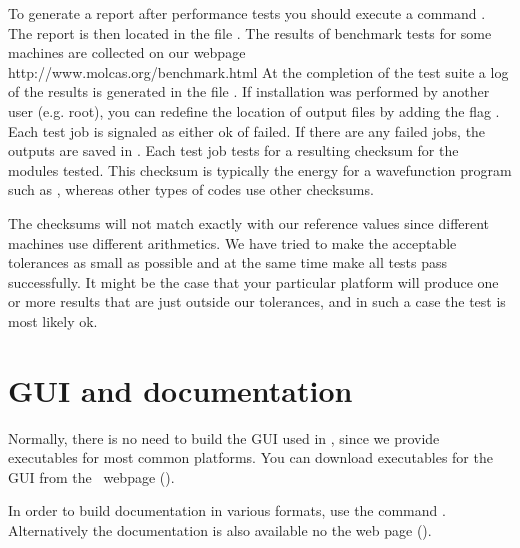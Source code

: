 To generate a report after performance tests you should execute
  a command . The report is then located in the file
  . The results of benchmark tests
  for some machines are collected on our webpage \\
  http://www.molcas.org/benchmark.html
At the completion of the test suite a log of the results is generated
in the file . If installation was performed
by another user (e.g. root), you can redefine the location of
output files by adding the flag .
Each test job is signaled as either
ok of failed. If there are any failed jobs, the outputs are saved in
. Each test job tests for a resulting checksum
for the modules tested. This checksum is typically the energy for a
wavefunction program such as , whereas other types of
codes use other checksums.

The checksums will not match exactly with our reference values since
different machines use different arithmetics. We have tried to make
the acceptable tolerances as small as possible and at the same time
make all tests pass successfully. It might be the case that your
particular platform will produce one or more results that are
just outside our tolerances, and in such a case the test is most
likely ok.

\section{\label{sec:building_html_doc}GUI and documentation}

Normally, there is no need to build the GUI used in \molcas, since we
provide executables for most common platforms.
You can download executables for the GUI from the \molcas\ webpage (\MolcasWWW).

In order to build documentation in various formats, use the command .
Alternatively the documentation is also available no the web page (\MolcasWWW).
